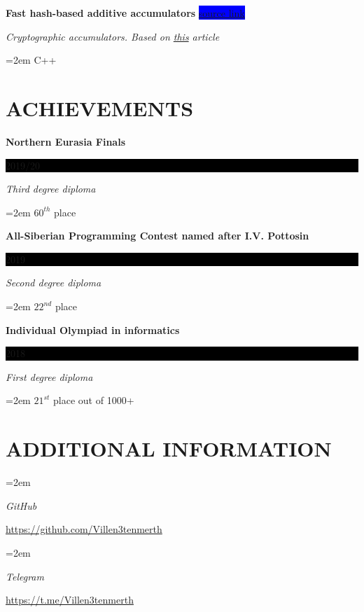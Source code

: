 \documentclass[paper=a4,fontsize=11pt]{scrartcl} %
\newlength{\spacebox}
\newcommand{\sepspace}{\vspace*{1em}}		%
\newcommand{\NewPart}[1]{\section*{\uppercase{#1}}}
\newcommand{\PersonalEntry}[2]{
		\noindent\hangindent=2em\hangafter=0 %
		\parbox{\spacebox}{        %
		\textit{#1}}		       %
		\hspace{1.5em} #2 \par}    %
\newcommand{\SkillsEntry}[2]{      %
		\noindent\hangindent=2em\hangafter=0 %
		\parbox{\spacebox}{        %
		\textit{#1}}			   %
		\hspace{1.5em} #2 \par}    %
\newcommand{\EducationEntry}[4]{
		\noindent \textbf{#1} \hfill      %
		\colorbox{Black}{%
			\parbox{6em}{%
			\hfill\color{White}#2}} \par  %
		\noindent \textit{#3} \par        %
		\noindent\hangindent=2em\hangafter=0 \small #4 %
		\normalsize \par}
\newcommand{\WorkEntry}[4]{				  %
		\noindent \textbf{#1} \hfill      %
		\colorbox{Blue}{\color{White}#2} \par  %
		\noindent \textit{#3} \par              %
		\noindent\hangindent=2em\hangafter=0 \small #4 %
		\normalsize \par}
\begin{document}
\WorkEntry{Fast hash-based additive accumulators}{\href{https://github.com/IvanMaslov/AdditiveAccumulator}{source link}}{Cryptographic accumulators. Based on \href{https://github.com/bigspider/accumulator/blob/master/docs/paper-draft.pdf}{this} article}{C++}
\sepspace

\NewPart{Achievements}{}

\EducationEntry{Northern Eurasia Finals}{2019/20}{Third degree diploma}{$60^{th}$ place}
\sepspace

\EducationEntry{All-Siberian Programming Contest named after I.V. Pottosin}{2019}{Second degree diploma}{$22^{nd}$ place}
\sepspace

\EducationEntry{Individual Olympiad in informatics}{2018}{First degree diploma}{$21^{st}$ place out of 1000+}
\sepspace

\NewPart{Additional information}{}

\SkillsEntry{GitHub}{\href{https://github.com/Villen3tenmerth}{https://github.com/Villen3tenmerth} }
\sepspace

\SkillsEntry{Telegram}{\href{https://t.me/Villen3tenmerth}{https://t.me/Villen3tenmerth} }
\end{document}
